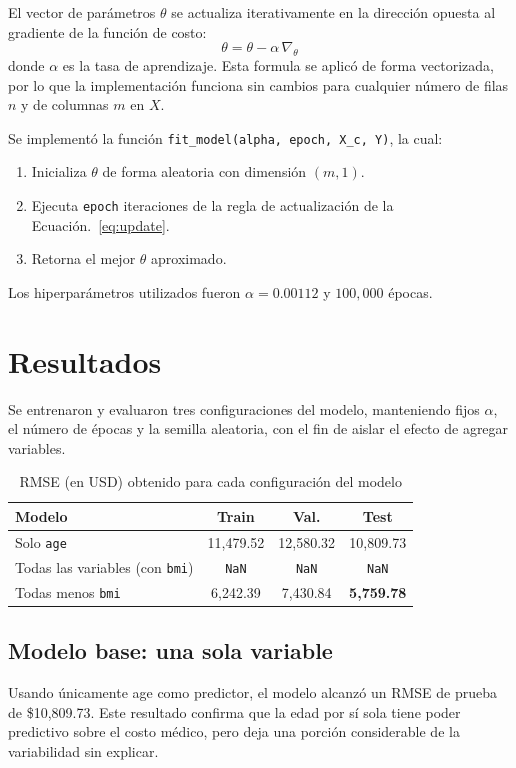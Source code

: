 \documentclass[journal]{IEEEtran}
\begin{document}
El vector de parámetros $\theta$ se actualiza iterativamente en la dirección opuesta al gradiente de la función de costo:
\begin{equation}
\theta = \theta - \alpha \,\nabla_\theta 
\label{eq:update}
\end{equation}
donde $\alpha$ es la tasa de aprendizaje. Esta formula se aplicó de forma vectorizada, por lo que la implementación funciona sin cambios para cualquier número de filas $n$ y de columnas $m$ en $X$.

Se implementó la función \texttt{fit\_model(alpha, epoch, X\_c, Y)}, la cual:
\begin{enumerate}
    \item Inicializa $\theta$ de forma aleatoria con dimensión $(m,1)$.
    \item Ejecuta \texttt{epoch} iteraciones de la regla de actualización de la Ecuación.~\eqref{eq:update}.
    \item Retorna el mejor $\theta$ aproximado.
\end{enumerate}

Los hiperparámetros utilizados fueron $\alpha = 0.00112$ y $100{,}000$ épocas.

\section{Resultados}

Se entrenaron y evaluaron tres configuraciones del modelo, manteniendo fijos $\alpha$, el número de épocas y la semilla aleatoria, con el fin de aislar el efecto de agregar variables.

\begin{table}[!ht]
\centering
\caption{RMSE (en USD) obtenido para cada configuración del modelo}
\label{tab:resultados}
\begin{tabular}{lccc}
\toprule
\textbf{Modelo} & \textbf{Train} & \textbf{Val.} & \textbf{Test} \\
\midrule
Solo \texttt{age} & 11{,}479.52 & 12{,}580.32 & 10{,}809.73 \\
Todas las variables (con \texttt{bmi}) & \texttt{NaN} & \texttt{NaN} & \texttt{NaN} \\
Todas menos \texttt{bmi} & 6{,}242.39 & 7{,}430.84 & \textbf{5{,}759.78} \\
\bottomrule
\end{tabular}
\end{table}

\subsection{Modelo base: una sola variable}
Usando únicamente age como predictor, el modelo alcanzó un RMSE de prueba de \$10{,}809.73. Este resultado confirma que la edad por sí sola tiene poder predictivo sobre el costo médico, pero deja una porción considerable de la variabilidad sin explicar.
\end{document}
